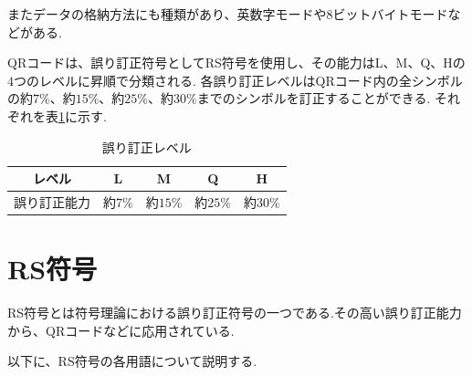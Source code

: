 \documentclass{thesis}
\begin{document}
またデータの格納方法にも種類があり、英数字モードや8ビットバイトモードなどがある.

QRコードは、誤り訂正符号としてRS符号を使用し、その能力はL、M、Q、Hの$4$つのレベルに昇順で分類される.
各誤り訂正レベルはQRコード内の全シンボルの約$7\%$、約$15\%$、約$25\%$、約$30\%$までのシンボルを訂正することができる.
それぞれを表\ref{Correction_ability}に示す.

\begin{table}[htbp]
\begin{center}
  \caption{誤り訂正レベル \label{Correction_ability}}
    \begin{tabular}{|c|c|c|c|c|} \hline
     レベル&L&M&Q&H\\ \hline\hline
     誤り訂正能力&約$7\%$&約$15\%$&約$25\%$&約$30\%$ \\ \hline
    \end{tabular}{}
\end{center}
\end{table}


\section{RS符号}
RS符号とは符号理論における誤り訂正符号の一つである.その高い誤り訂正能力から、QRコードなどに応用されている.


以下に、RS符号の各用語について説明する.
\end{document}
